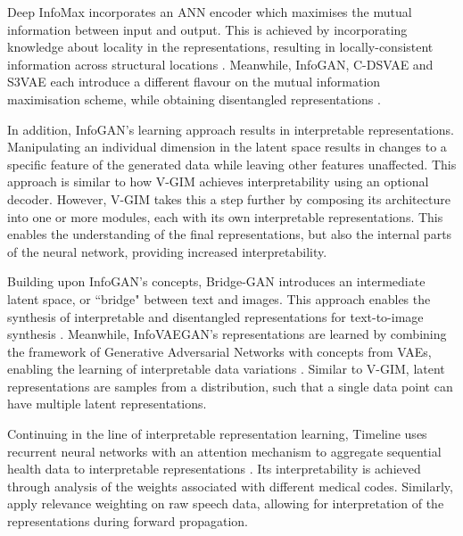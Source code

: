 	Deep InfoMax incorporates an ANN encoder which maximises the mutual information between input and output. This is achieved by incorporating knowledge about locality in the representations, resulting in locally-consistent information across structural locations \citep{hjelmLearningDeepRepresentations2019}. Meanwhile, InfoGAN, C-DSVAE and S3VAE each introduce a different flavour on the mutual information maximisation scheme, while obtaining disentangled representations \citep{chenInfoGANInterpretableRepresentation2016, baiContrastivelyDisentangledSequential2021, zhuS3VAESelfSupervisedSequential2020}. 
	
	In addition, InfoGAN's learning approach results in interpretable representations. Manipulating an individual dimension in the latent space results in changes to a specific feature of the generated data while leaving other features unaffected. This approach is similar to how V-GIM achieves interpretability using an optional decoder. However, V-GIM takes this a step further by composing its architecture into one or more modules, each with its own interpretable representations. This enables the understanding of the final representations, but also the internal parts of the neural network, providing increased interpretability.
	
	Building upon InfoGAN's concepts, Bridge-GAN introduces an intermediate latent space, or ``bridge" between text and images. This approach enables the synthesis of interpretable and disentangled representations for text-to-image synthesis \citep{yuanBridgeGANInterpretableRepresentation2020}. Meanwhile, InfoVAEGAN's representations are learned by combining the framework of Generative Adversarial Networks with concepts from VAEs, enabling the learning of interpretable data variations \citep{yeInfoVAEGANLearningJoint2021}. Similar to V-GIM, latent representations are samples from a distribution, such that a single data point can have multiple latent representations.
	
	Continuing in the line of interpretable representation learning, Timeline uses recurrent neural networks with an attention mechanism to aggregate sequential health data to interpretable representations \citep{baiInterpretableRepresentationLearning2018}. Its interpretability is achieved through analysis of the weights associated with different medical codes. Similarly, \cite{agrawalInterpretableRepresentationLearning2020} apply relevance weighting on raw speech data, allowing for interpretation of the representations during forward propagation. 
	
